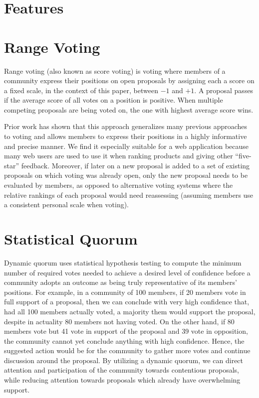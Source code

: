 \documentclass[chi_draft]{sigchi}
\begin{document}
\section{Features}

\section{Range Voting}

Range voting (also known as score voting) is voting where members of a community express their positions on open proposals by assigning
each a score on a fixed scale, in the context of this paper, between $-1$ and $+1$.
A proposal passes if the average score of all votes on a position is positive.
When multiple competing proposals are being voted on, the one with highest average score wins.

Prior work has shown that this approach generalizes many previous approaches to voting and allows members to express their
positions in a highly informative and precise manner.
We find it especially suitable for a web application because many web users are used to use it when ranking products
and giving other ``five-star'' feedback.
Moreover, if later on a new proposal is added to a set of existing proposals on which voting was already open, only the
new proposal needs to be evaluated by members, as opposed to alternative voting systems where the relative rankings of
each proposal would need reassessing (assuming members use a consistent personal scale when voting).

\section{Statistical Quorum}
\label{sec:statistical-quorum}


Dynamic quorum uses statistical hypothesis testing to compute the minimum number of required votes needed
to achieve a desired level of confidence before a community adopts an outcome as being truly representative of
its members' positions.
For example, in a community of 100 members, if 20 members vote in full support of a proposal, then we can conclude
with very high confidence that, had all 100 members actually voted, a majority them would support the proposal,
despite in actuality 80 members not having voted.
On the other hand, if 80 members vote but 41 vote in support of the proposal and 39 vote in opposition,
the community cannot yet conclude anything with high confidence.
Hence, the suggested action would be for the community to gather more votes and continue discussion around the proposal.
By utilizing a dynamic quorum, we can direct attention and participation of the community towards contentious proposals,
while reducing attention towards proposals which already have overwhelming support.
\end{document}

